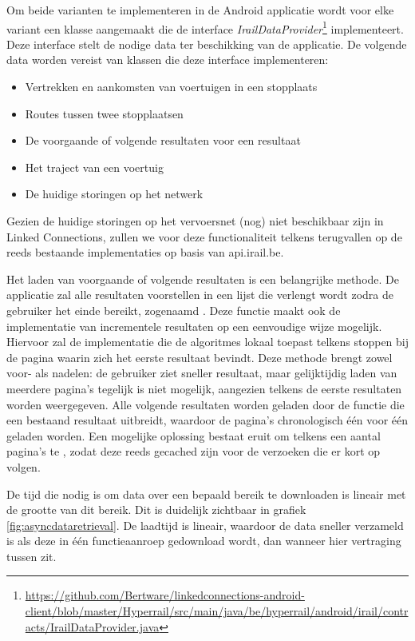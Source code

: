 Om beide varianten te implementeren in de Android applicatie wordt voor elke variant een klasse aangemaakt die de interface \emph{IrailDataProvider}\footnote{\url{https://github.com/Bertware/linkedconnections-android-client/blob/master/Hyperrail/src/main/java/be/hyperrail/android/irail/contracts/IrailDataProvider.java}} implementeert. Deze interface stelt de nodige data ter beschikking van de applicatie. De volgende data worden vereist van klassen die deze interface implementeren:

\begin{itemize}
	\item Vertrekken en aankomsten van voertuigen in een stopplaats
	\item Routes tussen twee stopplaatsen
	\item De voorgaande of volgende resultaten voor een resultaat
	\item Het traject van een voertuig
	\item De huidige storingen op het netwerk
\end{itemize}

Gezien de huidige storingen op het vervoersnet (nog) niet beschikbaar zijn in Linked Connections, zullen we voor deze functionaliteit telkens terugvallen op de reeds bestaande implementaties op basis van api.irail.be.

Het laden van voorgaande of volgende resultaten is een belangrijke methode. De applicatie zal alle resultaten voorstellen in een lijst die verlengt wordt zodra de gebruiker het einde bereikt, zogenaamd . Deze functie maakt ook de implementatie van incrementele resultaten op een eenvoudige wijze mogelijk. Hiervoor zal de implementatie die de algoritmes lokaal toepast telkens stoppen bij de pagina waarin zich het eerste resultaat bevindt. Deze methode brengt zowel voor- als nadelen: de gebruiker ziet sneller resultaat, maar gelijktijdig laden van meerdere pagina's tegelijk is niet mogelijk, aangezien telkens de eerste resultaten worden weergegeven. Alle volgende resultaten worden geladen door de functie die een bestaand resultaat uitbreidt, waardoor de pagina's chronologisch één voor één geladen worden. Een mogelijke oplossing bestaat eruit om telkens een aantal pagina's te , zodat deze reeds gecached zijn voor de verzoeken die er kort op volgen.

De tijd die nodig is om data over een bepaald bereik te downloaden is lineair met de grootte van dit bereik. Dit is duidelijk zichtbaar in grafiek \ref{fig:asyncdataretrieval}. De laadtijd is lineair, waardoor de data sneller verzameld is als deze in één functieaanroep gedownload wordt, dan wanneer hier vertraging tussen zit.

